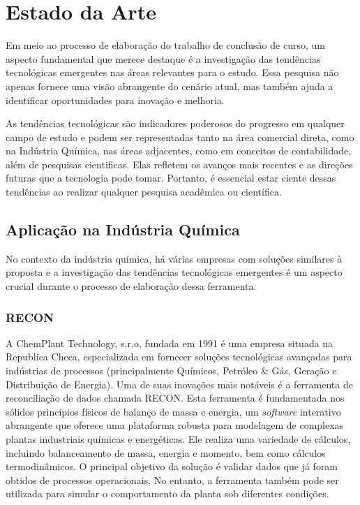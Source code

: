 \section{Estado da Arte}

Em meio ao processo de elaboração do trabalho de conclusão de curso, um aspecto fundamental que merece destaque é a investigação das tendências tecnológicas emergentes nas áreas relevantes para o estudo. Essa pesquisa não apenas fornece uma visão abrangente do cenário atual, mas também ajuda a identificar oportunidades para inovação e melhoria.

As tendências tecnológicas são indicadores poderosos do progresso em qualquer campo de estudo e podem ser representadas tanto na área comercial direta, como na Indústria Química, nas áreas adjacentes, como em conceitos de contabilidade, além de pesquisas cientificas. Elas refletem os avanços mais recentes e as direções futuras que a tecnologia pode tomar. Portanto, é essencial estar ciente dessas tendências ao realizar qualquer pesquisa acadêmica ou científica.

\subsection{Aplicação na Indústria Química}

No contexto da indústria química, há várias empresas com soluções similares à proposta e a investigação das tendências tecnológicas emergentes é um aspecto crucial durante o processo de elaboração dessa ferramenta. 

\subsubsection{RECON}

A ChemPlant Technology, s.r.o, fundada em 1991 é uma empresa situada na Republica Checa, especializada em fornecer soluções tecnológicas avançadas para indústrias de processos (principalmente Químicos, Petróleo $\&$ Gás, Geração e Distribuição de Energia). Uma de suas inovações mais notáveis é a ferramenta de reconciliação de dados chamada RECON. Esta ferramenta é fundamentada nos sólidos princípios físicos de balanço de massa e energia, um \textit{software} interativo abrangente que oferece uma plataforma robusta para modelagem de complexas plantas industriais químicas e energéticas. Ele realiza uma variedade de cálculos, incluindo balanceamento de massa, energia e momento, bem como cálculos termodinâmicos. O principal objetivo da solução é validar dados que já foram obtidos de processos operacionais. No entanto, a ferramenta também pode ser utilizada para simular o comportamento da planta sob diferentes condições.

